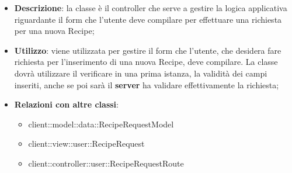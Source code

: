 			\begin{itemize}
				\item \textbf{Descrizione}: la classe è il controller che serve a gestire la logica applicativa riguardante il form che l'utente deve compilare per effettuare una richiesta per una nuova Recipe;
				\item \textbf{Utilizzo}: viene utilizzata per gestire il form che l'utente, che desidera fare richiesta per l'inserimento di una nuova Recipe, deve compilare. La classe dovrà utilizzare il verificare in una prima istanza, la validità dei campi inseriti, anche se poi sarà il \textbf{server} ha validare effettivamente la richiesta;
				\item \textbf{Relazioni con altre classi}:
					\begin{itemize}
						\item client::model::data::RecipeRequestModel
						\item client::view::user::RecipeRequest
						\item client::controller::user::RecipeRequestRoute
					\end{itemize}


\end{itemize}
